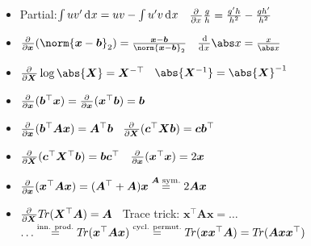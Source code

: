 \begin{itemize}
    \item Partial:\enskip $\int u v' \diff x = u v - \int u' v \diff x$
        \quad\textbullet\,
        $\pderiv{}{x} \frac{g}{h} = \frac{g'h}{h^2} - \frac{gh'}{h^2}$
    \item $\pderiv{}{\bm x} (\norm{\bm x - \bm b}_2) = \frac{\bm x-\bm b}{\norm{\bm x-\bm b}_2}$
        \quad\textbullet\,
        $\deriv{}{x} \abs x = \frac{x}{\abs x}$
    \item $\pderiv{}{\bm X} \log \abs{\bm X} = \bm X^{-\top}$
        \quad\textbullet\,
        $\abs{\bm X^{-1}} = \abs{\bm X}^{-1}$
        
    \item $\pderiv{}{\bm x} (\bm b^\top\bm  x) = \pderiv{}{\bm x} (\bm x^\top\bm  b) = \bm b$
    \item $\pderiv{}{\bm x} (\bm b^\top \bm{Ax}) = \bm A^\top \bm b$
        \quad\textbullet\,
        $\pderiv{}{\bm X} (\bm c^\top \bm{Xb}) = \bm{cb}^\top$
    \item $\pderiv{}{\bm X} (\bm c^\top \bm X^\top \bm b) = \bm{bc}^\top$
        \quad\textbullet\,
        $\pderiv{}{\bm x} (\bm x^\top \bm x) = 2\bm x$
    \item $\pderiv{}{\bm x} (\bm x^\top \bm{Ax}) = (\bm A^\top + \bm A)\bm x \overset{\bm A\textrm{ sym.}}{=} 2\bm{Ax}$
    \item $\pderiv{}{\bm X} T\!r(\bm X^\top \bm A) = \bm A$
        \quad\textbullet\,
        Trace trick:\enspace
            $\bm x^\top \bm{Ax} = \ldots$\\\hfill
            $\ldots \overset{\small\substack{\textrm{inn. prod.}}}{=} T\!r (\bm x^\top \bm{Ax}) \overset{\small\substack{\textrm{cycl. permut.}}}{=} T\!r(\bm{xx}^\top \bm A) = T\!r(\bm{Axx}^\top)$

\end{itemize}


